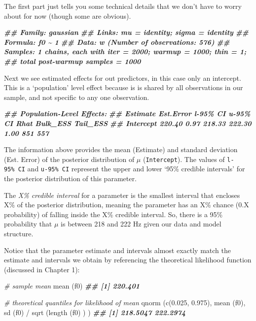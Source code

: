 \documentclass[
]{book}
\newenvironment{Shaded}{\begin{snugshade}}{\end{snugshade}}
\newcommand{\CommentTok}[1]{\textcolor[rgb]{0.56,0.35,0.01}{\textit{#1}}}
\newcommand{\DocumentationTok}[1]{\textcolor[rgb]{0.56,0.35,0.01}{\textbf{\textit{#1}}}}
\newcommand{\FloatTok}[1]{\textcolor[rgb]{0.00,0.00,0.81}{#1}}
\newcommand{\FunctionTok}[1]{\textcolor[rgb]{0.00,0.00,0.00}{#1}}
\newcommand{\NormalTok}[1]{#1}
\newcommand{\SpecialCharTok}[1]{\textcolor[rgb]{0.00,0.00,0.00}{#1}}
\begin{document}
The first part just tells you some technical details that we don't have to worry about for now (though some are obvious).

\begin{Shaded}
\begin{Highlighting}[]
\DocumentationTok{\#\#  Family: gaussian }
\DocumentationTok{\#\#   Links: mu = identity; sigma = identity }
\DocumentationTok{\#\# Formula: f0 \textasciitilde{} 1 }
\DocumentationTok{\#\#    Data: w (Number of observations: 576) }
\DocumentationTok{\#\# Samples: 1 chains, each with iter = 2000; warmup = 1000; thin = 1;}
\DocumentationTok{\#\#          total post{-}warmup samples = 1000}
\end{Highlighting}
\end{Shaded}

Next we see estimated effects for out predictors, in this case only an intercept. This is a `population' level effect because is is shared by all observations in our sample, and not specific to any one observation.

\begin{Shaded}
\begin{Highlighting}[]
\DocumentationTok{\#\# Population{-}Level Effects: }
\DocumentationTok{\#\#           Estimate Est.Error l{-}95\% CI u{-}95\% CI Rhat Bulk\_ESS Tail\_ESS}
\DocumentationTok{\#\# Intercept   220.40      0.97   218.33   222.30 1.00      851      557}
\end{Highlighting}
\end{Shaded}

The information above provides the mean (Estimate) and standard deviation (Est. Error) of the posterior distribution of \(\mu\) (\texttt{Intercept}). The values of \texttt{l-95\%\ CI} and \texttt{u-95\%\ CI} represent the upper and lower `95\% credible intervals' for the posterior distribution of this parameter.

The \emph{X\% credible interval} for a parameter is the smallest interval that encloses X\% of the posterior distribution, meaning the parameter has an X\% chance (0.X probability) of falling inside the X\% credible interval. So, there is a 95\% probability that \(\mu\) is between 218 and 222 Hz given our data and model structure.

Notice that the parameter estimate and intervals almost exactly match the estimate and intervals we obtain by referencing the theoretical likelihood function (discussed in Chapter 1):

\begin{Shaded}
\begin{Highlighting}[]
\CommentTok{\# sample mean}
\FunctionTok{mean}\NormalTok{ (f0)}
\DocumentationTok{\#\# [1] 220.401}

\CommentTok{\# theoretical quantiles for likelihood of mean}
\FunctionTok{qnorm}\NormalTok{ (}\FunctionTok{c}\NormalTok{(}\FloatTok{0.025}\NormalTok{, }\FloatTok{0.975}\NormalTok{), }\FunctionTok{mean}\NormalTok{ (f0), }\FunctionTok{sd}\NormalTok{ (f0) }\SpecialCharTok{/} \FunctionTok{sqrt}\NormalTok{ (}\FunctionTok{length}\NormalTok{ (f0) ) )}
\DocumentationTok{\#\# [1] 218.5047 222.2974}
\end{Highlighting}
\end{Shaded}
\end{document}
